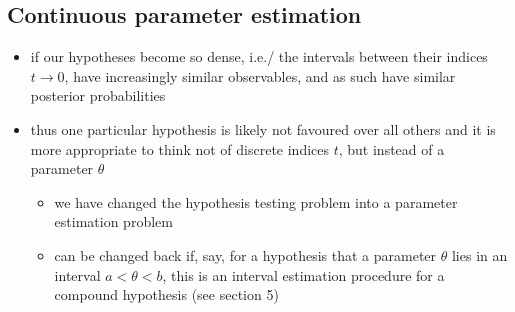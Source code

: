 \documentclass[../jaynes_prob_theory_notes.tex]{subfiles}
\begin{document}
\subsection{Continuous parameter estimation}
    \begin{itemize}
        \item if our hypotheses become so dense, i.e./ the intervals between their indices $t \rightarrow 0$, have increasingly similar observables, and as such have similar posterior probabilities
        \item thus one particular hypothesis is likely not favoured over all others and it is more appropriate to think not of discrete indices $t$, but instead of a parameter $\theta$
            \begin{itemize}
                \item we have changed the hypothesis testing problem into a parameter estimation problem
                \item can be changed back if, say, for a hypothesis that a parameter $\theta$ lies in an interval $a < \theta < b$, this is an interval estimation procedure for a compound hypothesis (see section 5)
            \end{itemize}
    \end{itemize}
\end{document}
